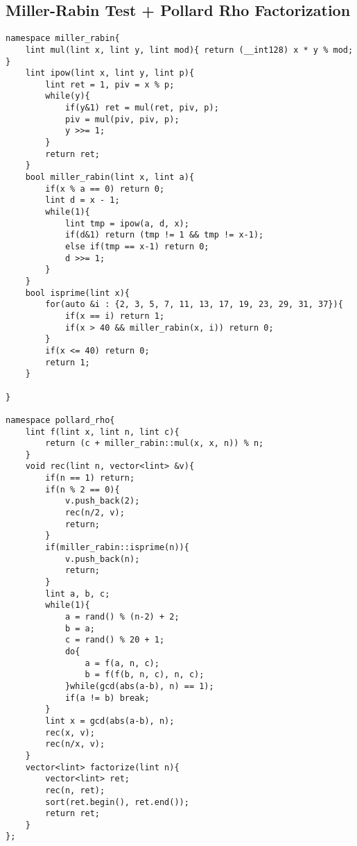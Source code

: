 \documentclass[landscape, 8pt, a4paper, oneside, twocolumn]{extarticle}
\begin{document}
\subsection{Miller-Rabin Test + Pollard Rho Factorization}
\begin{verbatim}
namespace miller_rabin{
    lint mul(lint x, lint y, lint mod){ return (__int128) x * y % mod; }
	lint ipow(lint x, lint y, lint p){
		lint ret = 1, piv = x % p;
		while(y){
			if(y&1) ret = mul(ret, piv, p);
			piv = mul(piv, piv, p);
			y >>= 1;
		}
		return ret;
	}
	bool miller_rabin(lint x, lint a){
		if(x % a == 0) return 0;
		lint d = x - 1;
		while(1){
			lint tmp = ipow(a, d, x);
			if(d&1) return (tmp != 1 && tmp != x-1);
			else if(tmp == x-1) return 0;
			d >>= 1;
		}
	}
	bool isprime(lint x){
		for(auto &i : {2, 3, 5, 7, 11, 13, 17, 19, 23, 29, 31, 37}){
			if(x == i) return 1;
			if(x > 40 && miller_rabin(x, i)) return 0;
		}
		if(x <= 40) return 0;
		return 1;
	}

}

namespace pollard_rho{
	lint f(lint x, lint n, lint c){
		return (c + miller_rabin::mul(x, x, n)) % n;
	}
	void rec(lint n, vector<lint> &v){
		if(n == 1) return;
		if(n % 2 == 0){
			v.push_back(2);
			rec(n/2, v);
			return;
		}
		if(miller_rabin::isprime(n)){
			v.push_back(n);
			return;
		}
		lint a, b, c;
		while(1){
			a = rand() % (n-2) + 2;
			b = a;
			c = rand() % 20 + 1;
			do{
				a = f(a, n, c);
				b = f(f(b, n, c), n, c);
			}while(gcd(abs(a-b), n) == 1);
			if(a != b) break;
		}
		lint x = gcd(abs(a-b), n);
		rec(x, v);
		rec(n/x, v);
	}
	vector<lint> factorize(lint n){
		vector<lint> ret;
		rec(n, ret);
		sort(ret.begin(), ret.end());
		return ret;
	}
};
\end{verbatim}
\end{document}
